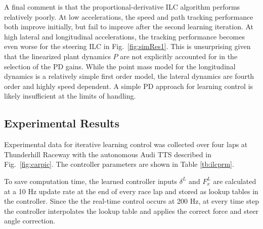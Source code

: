 \documentclass[9pt,shortpaper,twoside,web]{ieeecolor}
\begin{document}
{{{A final comment is that the proportional-derivative ILC algorithm performs relatively poorly. At low accelerations, the
speed and path tracking performance both improve initially, but fail to improve after the second learning iteration. At high
lateral and longitudinal accelerations, the tracking performance becomes even worse for the steering ILC in Fig.~\ref{fig:simRes1}.  
This is unsurprising given that the linearized plant dynamics $P$ are not explicitly accounted for in the selection of the PD gains. 
While the point mass model for the longitudinal dynamics is a relatively simple first order model, the lateral dynamics 
are fourth order and highly speed dependent. A simple PD approach for learning control is likely insufficient at the limits of handling.

\subsection{Experimental Results}
\label{sec:ch4ExpRes}

Experimental data for iterative learning control was collected over four laps at Thunderhill Raceway with the autonomous Audi TTS
described in Fig.~\ref{fig:carpic}. The controller parameters are shown in Table \ref{tb:ilcprm}. 


To save computation time, the learned controller inputs $\delta^L$ and $F^L_x$  are calculated at a 10 Hz update rate at the end of every race lap and stored as lookup tables in the controller. 
Since the the real-time control occurs at 200 Hz, at every time step the controller interpolates
the lookup table and applies the correct force and steer angle correction. 

}}}
\end{document}
